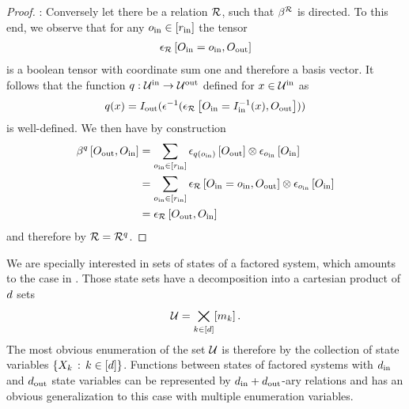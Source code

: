 \begin{proof}
    \proofleftsymbol{}:
    Conversely let there be a relation $\mathcal{R}$, such that $\beta^{\mathcal{R}}$ is directed.
    To this end, we observe that for any $o_{\mathrm{in}}\in[r_{\mathrm{in}}]$ the tensor
    \begin{align*}
        \epsilon_{\mathcal{R}}\left[O_{\mathrm{in}}=o_{\mathrm{in}},O_{\mathrm{out}}\right]
    \end{align*}
    is a boolean tensor with coordinate sum one and therefore a basis vector.
    It follows that the function $q : \mathcal{U}^{\mathrm{in}} \rightarrow \mathcal{U}^{\mathrm{out}} $ defined for $x\in\mathcal{U}^{\mathrm{in}}$ as
    \begin{align*}
        q(x)
        = I_{\mathrm{out}}(\epsilon^{-1}(\epsilon_{\mathcal{R}}\left[O_{\mathrm{in}}=I_{\mathrm{in}}^{-1}(x),O_{\mathrm{out}}\right]))
    \end{align*}
    is well-defined.
    We then have by construction
    \begin{align*}
        \beta^{q}\left[O_{\mathrm{out}},O_{\mathrm{in}}\right]
        & = \sum_{o_{\mathrm{in}}\in[r_{\mathrm{in}}]}
        \epsilon_{q(o_{\mathrm{in}})}\left[O_{\mathrm{out}}\right] \otimes
        \epsilon_{o_{\mathrm{in}}}\left[O_{\mathrm{in}}\right] \\
        & =  \sum_{o_{\mathrm{in}}\in[r_{\mathrm{in}}]} \epsilon_{\mathcal{R}}\left[O_{\mathrm{in}}=o_{\mathrm{in}},O_{\mathrm{out}}\right] \otimes
        \epsilon_{o_{\mathrm{in}}}\left[O_{\mathrm{in}}\right] \\
        & = \epsilon_{\mathcal{R}}\left[O_{\mathrm{out}},O_{\mathrm{in}}\right]
    \end{align*}
    and therefore by  $\mathcal{R}=\mathcal{R}^{q}$.
\end{proof}

We are specially interested in sets of states of a factored system, which amounts to the case in .
Those state sets have a decomposition into a cartesian product of $d$ sets
\[ \mathcal{U} = \bigtimes_{k\in[d]}[m_{k}] \, . \]
The most obvious enumeration of the set $\mathcal{U}$ is therefore by the collection of state variables $\{X_{k}\,:\, k\in[d] \}$.
Functions between states of factored systems with $d_{\mathrm{in}}$ and $d_{\mathrm{out}}$ state variables can be represented by $d_{\mathrm{in}}+d_{\mathrm{out}}$-ary relations and  has an obvious generalization to this case with multiple enumeration variables.

